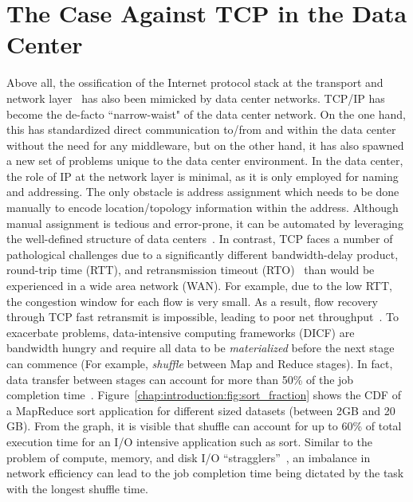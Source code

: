 \documentclass[a4paper,12pt,twoside,openright]{report}
\begin{document}
\section{The Case Against TCP in the Data Center}
Above all, the ossification of the Internet protocol stack at the transport and
network layer~\cite{Akhshabi:2011:ELP} has also been mimicked by data center
networks. TCP/IP has become the de-facto ``narrow-waist" of the data center
network. On the one hand, this has standardized direct communication to/from and
within the data center without the need for any middleware, but on the other
hand, it has also spawned a new set of problems unique to the data center
environment. In the data center, the role of IP at the network layer is minimal,
as it is only employed for naming and addressing. The only obstacle is address
assignment which needs to be done manually to encode location/topology
information within the address. Although manual assignment is tedious and
error-prone, it can be automated by leveraging the well-defined structure of
data centers~\cite{Chen:2010:GAA}. In contrast, TCP faces a number of
pathological challenges due to a significantly different bandwidth-delay
product, round-trip time (RTT), and retransmission timeout
(RTO)~\cite{Chen:2009:UTI} than would be experienced in a wide area network
(WAN). For example, due to the low RTT, the congestion window for each flow is
very small. As a result, flow recovery through TCP fast retransmit is
impossible, leading to poor net throughput~\cite{Kandula:2009:NDC}. To
exacerbate problems, data-intensive computing frameworks (DICF) are bandwidth
hungry and require all data to be \emph{materialized} before the next stage can
commence (For example, \emph{shuffle} between Map and Reduce stages). In fact,
data transfer between stages can account for more than 50\% of the job
completion time~\cite{Chowdhury:2011:MDT}.
Figure~\ref{chap:introduction:fig:sort_fraction} shows the CDF of a MapReduce
sort application for different sized datasets (between 2GB and 20 GB). From the
graph, it is visible that shuffle can account for up to 60\% of total execution
time for an I/O intensive application such as sort. Similar to the problem of
compute, memory, and disk I/O ``stragglers''~\cite{Zaharia:2008:IMP}, an
imbalance in network efficiency can lead to the job completion time being
dictated by the task with the longest shuffle time.
\end{document}
